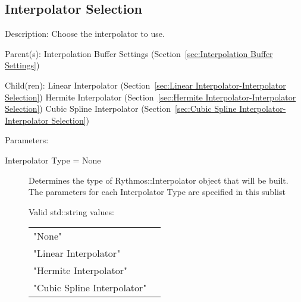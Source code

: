\subsection{Interpolator Selection}
\label{sec:Interpolator Selection-Interpolation Buffer Settings}

\begin{list}{}
  {\setlength{\leftmargin}{1.0in}
   \setlength{\labelwidth}{0.75in}
   \setlength{\labelsep}{0.125in}}
  \item[Description:]
    Choose the interpolator to use.
  \item[Parent(s):]
    Interpolation Buffer Settings (Section~\ref{sec:Interpolation Buffer Settings})
  \item[Child(ren):]
    Linear Interpolator (Section~\ref{sec:Linear Interpolator-Interpolator Selection})
      \newline 
    Hermite Interpolator (Section~\ref{sec:Hermite Interpolator-Interpolator Selection})
      \newline 
    Cubic Spline Interpolator (Section~\ref{sec:Cubic Spline Interpolator-Interpolator Selection})
  \item[Parameters:]
    \begin{description}
      \item[Interpolator Type = None] 
Determines the type of Rythmos::Interpolator object that will be built.
The parameters for each Interpolator Type are specified in this sublist

  Valid std::string values:

      \begin{tabular}{lp{}}
      "None" & \\ 
      "Linear Interpolator" & \\ 
      "Hermite Interpolator" & \\ 
      "Cubic Spline Interpolator" & \\ 
      \end{tabular}
\end{description}

\end{list}

